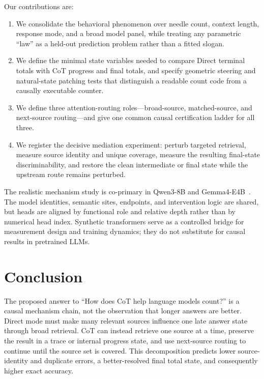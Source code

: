 \documentclass[11pt]{article}
\begin{document}
Our contributions are:
\begin{enumerate}
  \item We consolidate the behavioral phenomenon over needle count, context length, response mode, and a broad model panel, while treating any parametric ``law'' as a held-out prediction problem rather than a fitted slogan.
  \item We define the minimal state variables needed to compare Direct terminal totals with CoT progress and final totals, and specify geometric steering and natural-state patching tests that distinguish a readable count code from a causally executable counter.
  \item We define three attention-routing roles---broad-source, matched-source, and next-source routing---and give one common causal certification ladder for all three.
  \item We register the decisive mediation experiment: perturb targeted retrieval, measure source identity and unique coverage, measure the resulting final-state discriminability, and restore the clean intermediate or final state while the upstream route remains perturbed.
\end{enumerate}

The realistic mechanism study is co-primary in Qwen3-8B and Gemma4-E4B~\citep{yang2025qwen3,gemmateam2026gemma4}. The model identities, semantic sites, endpoints, and intervention logic are shared, but heads are aligned by functional role and relative depth rather than by numerical head index. Synthetic transformers serve as a controlled bridge for measurement design and training dynamics; they do not substitute for causal results in pretrained LLMs.







\section{Conclusion}

The proposed answer to ``How does CoT help language models count?'' is a causal mechanism chain, not the observation that longer answers are better. Direct mode must make many relevant sources influence one late answer state through broad retrieval. CoT can instead retrieve one source at a time, preserve the result in a trace or internal progress state, and use next-source routing to continue until the source set is covered. This decomposition predicts lower source-identity and duplicate errors, a better-resolved final total state, and consequently higher exact accuracy.
\end{document}
